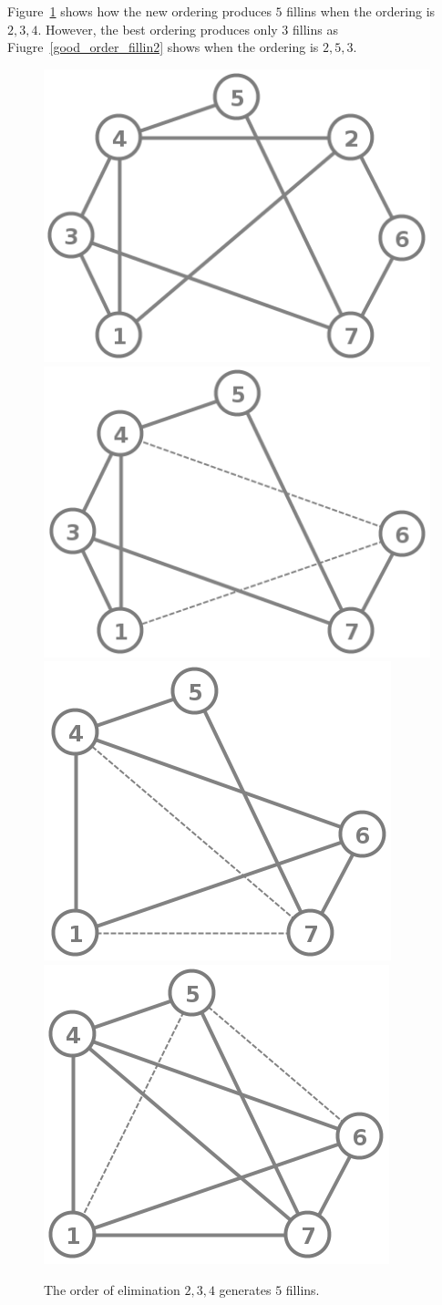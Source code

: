 \documentclass[12pt, oneside]{book}
\begin{document}
Figure~\ref{good_order_fillin} shows how the new ordering produces
$5$ fillins when the ordering is $2, 3, 4$. However, the best ordering produces only $3$ fillins
as Fiugre~\ref{good_order_fillin2} shows when the ordering is $2, 5, 3$.

\begin{figure}
\centering
   \includegraphics[width=0.4\linewidth]{good_order}
   \hfill
   \includegraphics[width=0.4\linewidth]{good_order_2_removed}
   \includegraphics[width=0.4\linewidth]{good_order_3_2}
   \hfill
   \includegraphics[width=0.4\linewidth]{good_order_4_3_2}
\caption{The order of elimination $2, 3, 4$ generates $5$ fillins.}
\label{good_order_fillin}
\end{figure}
\end{document}
